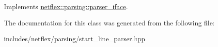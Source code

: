 Implements \hyperlink{classnetflex_1_1parsing_1_1parser__iface_a6b092567e70a5c0bf7568e94d06f7154}{netflex\+::parsing\+::parser\+\_\+iface}.



The documentation for this class was generated from the following file\+:\begin{DoxyCompactItemize}
\item 
includes/netflex/parsing/start\+\_\+line\+\_\+parser.\+hpp\end{DoxyCompactItemize}
